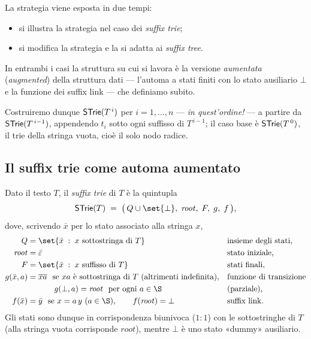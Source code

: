 La strategia viene esposta in due tempi:
\begin{itemize}
  \item[(a)] si illustra la strategia nel caso dei \emph{suffix trie};
  \item[(b)] si modifica la strategia e la si adatta ai \emph{suffix tree}.
\end{itemize}
In entrambi i casi la struttura su cui si lavora è la versione \emph{aumentata}
(\emph{augmented}) della struttura dati --- l'automa a stati finiti con lo stato ausiliario
$\bot$ e la funzione dei suffix link --- che definiamo subito.

Costruiremo dunque $\textsf{STrie}{}(T^{\,i})$ per $i = 1,\dots,n$ --- \emph{in quest'ordine!} --- a
partire da $\textsf{STrie}{}(T^{\,i-1})$, appendendo $t_i$ sotto ogni suffisso di $T^{\,i-1}$; il caso
base è $\textsf{STrie}{}(T^{\,0})$, il trie della stringa vuota, cioè il solo nodo radice.

\subsection{Il suffix trie come automa aumentato}

\begin{definizione}\label{def:strie-automa}
Dato il testo $T$, il \emph{suffix trie} di $T$ è la quintupla
\[
  \STrie{}(T)\;=\;\bigl(\,Q\cup\set{\bot},\;\mathit{root},\;F,\;g,\;f\,\bigr),
\]
dove, scrivendo $\bar{x}$ per lo stato associato alla stringa $x$,
\begin{align*}
  Q             &= \set{\bar{x} \;:\; x \text{ sottostringa di } T}
                   &&\text{insieme degli stati,}\\
  \mathit{root} &= \bar{\vuota} &&\text{stato iniziale,}\\
  F             &= \set{\bar{x} \;:\; x \text{ suffisso di } T} &&\text{stati finali,}\\
  g(\bar{x},a)  &= \overline{xa} \ \text{ se } xa \text{ è sottostringa di } T
                   \ \text{(altrimenti indefinita)}, &&\text{funzione di transizione}\\
                &\phantom{{}={}} \qquad g(\bot,a)=\mathit{root}
                   \ \text{ per ogni } a\in\S &&\text{(parziale),}\\
  f(\bar{x})    &= \bar{y} \ \text{ se } x = a\,y \ (a\in\S),
                   \qquad f(\mathit{root}) = \bot &&\text{suffix link.}
\end{align*}
Gli stati sono dunque in corrispondenza biunivoca ($1{:}1$) con le sottostringhe di $T$ (alla
stringa vuota corrisponde $\mathit{root}$), mentre $\bot$ è uno stato «dummy» ausiliario.
\end{definizione}

